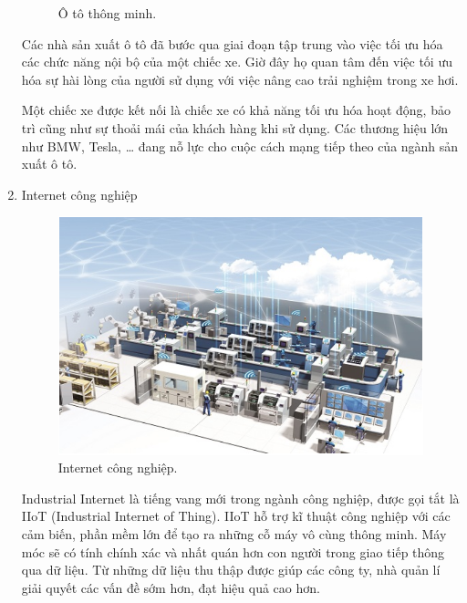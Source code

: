 \begin{enumerate}
\begin{center}
\begin{figure}[htp]
\begin{center}
    \end{center}
    \caption{Ô tô thông minh.}
    \label{refhinh1}
    \end{figure}
\end{center} 
    Các nhà sản xuất ô tô đã bước qua giai đoạn tập trung vào việc tối ưu hóa các chức năng nội bộ của một chiếc xe. Giờ đây họ quan tâm đến việc tối ưu hóa sự hài lòng của người sử dụng với việc nâng cao trải nghiệm trong xe hơi.

    Một chiếc xe được kết nối là chiếc xe có khả năng tối ưu hóa hoạt động, bảo trì cũng như sự thoải mái của khách hàng khi sử dụng. Các thương hiệu lớn như BMW, Tesla, … đang nỗ lực cho cuộc cách mạng tiếp theo của ngành sản xuất ô tô.
    
    \item Internet công nghiệp
 \begin{center}
    \begin{figure}[htp]
    \begin{center}
     \includegraphics[scale=0.6]{image1/congnghiep.png}
    \end{center}
    \caption{Internet công nghiệp.}
    \label{refhinh1}
    \end{figure}
\end{center} 
    Industrial Internet là tiếng vang mới trong ngành công nghiệp, được gọi tắt là IIoT (Industrial Internet of Thing). IIoT hỗ trợ kĩ thuật công nghiệp với các cảm biến, phần mềm lớn để tạo ra những cỗ máy vô cùng thông minh. Máy móc sẽ có tính chính xác và nhất quán hơn con người trong giao tiếp thông qua dữ liệu. Từ những dữ liệu thu thập được giúp các công ty, nhà quản lí giải quyết các vấn đề sớm hơn, đạt hiệu quả cao hơn.


\end{enumerate}
